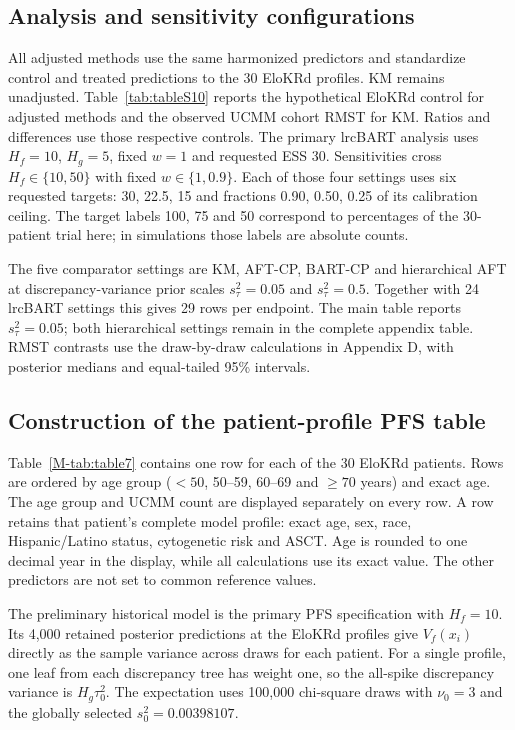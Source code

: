 \subsection{Analysis and sensitivity configurations}\label{sec:F.2}
All adjusted methods use the same harmonized predictors and standardize control and treated predictions to the 30 EloKRd profiles. KM remains unadjusted. Table~\ref{tab:tableS10} reports the hypothetical EloKRd control for adjusted methods and the observed UCMM cohort RMST for KM. Ratios and differences use those respective controls. The primary lrcBART analysis uses $H_f=10$, $H_g=5$, fixed $w=1$ and requested ESS 30. Sensitivities cross $H_f\in\{10,50\}$ with fixed $w\in\{1,0.9\}$. Each of those four settings uses six requested targets: 30, 22.5, 15 and fractions 0.90, 0.50, 0.25 of its calibration ceiling. The target labels 100, 75 and 50 correspond to percentages of the 30-patient trial here; in simulations those labels are absolute counts.

The five comparator settings are KM, AFT-CP, BART-CP and hierarchical AFT at discrepancy-variance prior scales $s_\tau^2=0.05$ and $s_\tau^2=0.5$. Together with 24 lrcBART settings this gives 29 rows per endpoint. The main table reports $s_\tau^2=0.05$; both hierarchical settings remain in the complete appendix table. RMST contrasts use the draw-by-draw calculations in Appendix D, with posterior medians and equal-tailed 95\% intervals.


\clearpage

\subsection{Construction of the patient-profile PFS table}\label{sec:F.3}
Table~\ref{M-tab:table7} contains one row for each of the 30 EloKRd patients. Rows are ordered by age group ($<50$, 50--59, 60--69 and $\geq70$ years) and exact age. The age group and UCMM count are displayed separately on every row. A row retains that patient's complete model profile: exact age, sex, race, Hispanic/Latino status, cytogenetic risk and ASCT. Age is rounded to one decimal year in the display, while all calculations use its exact value. The other predictors are not set to common reference values.

The preliminary historical model is the primary PFS specification with $H_f=10$. Its 4,000 retained posterior predictions at the EloKRd profiles give $V_f(x_i)$ directly as the sample variance across draws for each patient. For a single profile, one leaf from each discrepancy tree has weight one, so the all-spike discrepancy variance is $H_g\tau_0^2$. The expectation uses 100,000 chi-square draws with $\nu_0=3$ and the globally selected $s_0^2=0.00398107$.


